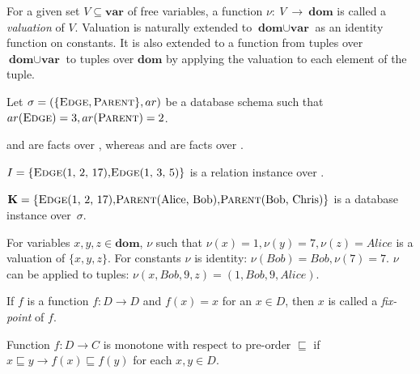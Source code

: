 \begin{defn}[Valuation]
For a given set $V \subseteq \textbf{var}$ of free variables, a function $\nu:~V~\to~\textbf{dom}$ is called a \emph{valuation} of $V$.
Valuation is naturally extended to $\textbf{dom} \cup \textbf{var}$ as an identity function on constants. It is also extended to a function from tuples over $\textbf{dom} \cup \textbf{var}$ to tuples over $\textbf{dom}$ by applying the valuation to each element of the tuple.
\end{defn}

\begin{exmp}
Let $\sigma = (\{\textsc{Edge}, \textsc{Parent}\}, ar)$ be a database schema such that $ar(\textsc{Edge}) = 3, ar(\textsc{Parent}) = 2$. 

 and  are facts over , whereas  and  are facts over . 

$I = \{\relat{Edge}{(1, 2, 17)}, \relat{Edge}{(1, 3, 5)}\}$ is a relation instance over .

$\textbf{K} = \{\relat{Edge}{(1, 2, 17)}, \relat{Parent}{(Alice, Bob)}, \relat{Parent}{(Bob, Chris)}\}$ is a database instance over~$\sigma$.

For variables $x, y, z \in \textbf{dom}$, $\nu$ such that $\nu(x) = 1, \nu(y) = 7, \nu(z) = Alice$ is a valuation of $\{x, y, z\}$. For constants $\nu$ is identity: $\nu(Bob) = Bob, \nu(7) = 7$. $\nu$ can be applied to tuples: $\nu(x, Bob, 9, z) = (1, Bob, 9, Alice)$.

\end{exmp}

\begin{defn}
If $f$ is a function $f: D \to D$ and $f(x) = x$ for an $x \in D$, then $x$ is called a \emph{fix-point} of $f$.
\end{defn}


\begin{defn}[Monotonicity]
Function $f: D \to C$ is monotone with respect to pre-order $\sqsubseteq$ if $x \sqsubseteq y \rightarrow f(x) \sqsubseteq f(y)$ for each $x, y \in D$.
\end{defn}

